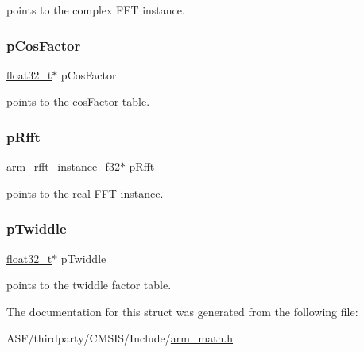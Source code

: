 points to the complex F\+FT instance. \mbox{\label{structarm__dct4__instance__f32_abd73b9d7fb4951ba086e4820c2a48eb0}} 
\subsubsection{\texorpdfstring{pCosFactor}{pCosFactor}}
{\footnotesize\ttfamily \mbox{\hyperlink{arm__math_8h_a4611b605e45ab401f02cab15c5e38715}{float32\+\_\+t}}$\ast$ p\+Cos\+Factor}

points to the cos\+Factor table. \mbox{\label{structarm__dct4__instance__f32_ad4cd7c85eea3f7c5fff4630bbd979e6a}} 
\subsubsection{\texorpdfstring{pRfft}{pRfft}}
{\footnotesize\ttfamily \mbox{\hyperlink{structarm__rfft__instance__f32}{arm\+\_\+rfft\+\_\+instance\+\_\+f32}}$\ast$ p\+Rfft}

points to the real F\+FT instance. \mbox{\label{structarm__dct4__instance__f32_aca581481fccdff0f557f54a3ef20d967}} 
\subsubsection{\texorpdfstring{pTwiddle}{pTwiddle}}
{\footnotesize\ttfamily \mbox{\hyperlink{arm__math_8h_a4611b605e45ab401f02cab15c5e38715}{float32\+\_\+t}}$\ast$ p\+Twiddle}

points to the twiddle factor table. 

The documentation for this struct was generated from the following file\+:\begin{DoxyCompactItemize}
\item 
A\+S\+F/thirdparty/\+C\+M\+S\+I\+S/\+Include/\mbox{\hyperlink{arm__math_8h}{arm\+\_\+math.\+h}}\end{DoxyCompactItemize}
